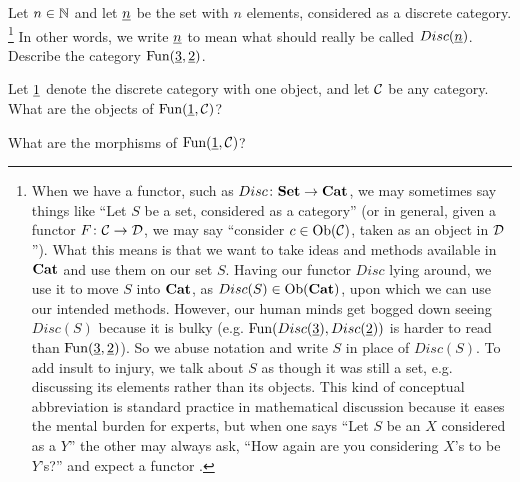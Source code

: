 \documentclass[CT4S-EN-RU]{subfiles}
\begin{document}
\begin{exerciseENG}
Let $n\in{\mathbb N}$ and let $\underline{n}$ be the set with $n$ elements, considered as a discrete category.
\footnote{When we have a functor, such as $Disc\colon{\bf Set}\rightarrow{\bf Cat}$, we may sometimes say things like “Let $S$ be a set, considered as a category” (or in general, given a functor $F\colon\mathcal{C}\rightarrow\mathcal{D}$, we may say “consider $c\in\textnormal{Ob}(\mathcal{C})$, taken as an object in $\mathcal{D}$”). What this means is that we want to take ideas and methods available in ${\bf Cat}$ and use them on our set $S$. Having our functor $Disc$ lying around, we use it to move $S$ into ${\bf Cat}$, as $Disc(S)\in\textnormal{Ob}({\bf Cat})$, upon which we can use our intended methods. However, our human minds get bogged down seeing $Disc(S)$ because it is bulky (e.g. $\textnormal{Fun}(Disc(\underline{3}),Disc(\underline{2}))$ is harder to read than $\textnormal{Fun}(\underline{3},\underline{2})$). So we abuse notation and write $S$ in place of  $Disc(S)$. To add insult to injury, we talk about $S$ as though it was still a set, e.g. discussing its elements rather than its objects. This kind of conceptual abbreviation is standard practice in mathematical discussion because it eases the mental burden for experts, but when one says “Let $S$ be an $X$ considered as a $Y$” the other may always ask, “How again are you considering $X$'s to be $Y$'s?” and expect a functor .}
In other words, we write $\underline{n}$ to mean what should really be called $Disc(\underline{n})$. Describe the category $\textnormal{Fun}(\underline{3},\underline{2})$.
\end{exerciseENG}

\begin{exerciseRUS}
\end{exerciseRUS}

\begin{exerciseENG}
Let $\underline{1}$ denote the discrete category with one object, and let $\mathcal{C}$ be any category.
\sexc What are the objects of $\textnormal{Fun}(\underline{1},\mathcal{C})$?
\item What are the morphisms of $\textnormal{Fun}(\underline{1},\mathcal{C})$?
\endsexc
\end{exerciseENG}

\begin{exerciseRUS}
\end{exerciseRUS}
\end{document}
